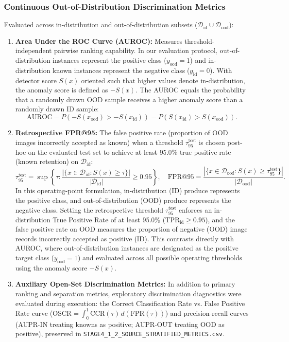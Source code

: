 \subsubsection{Continuous Out-of-Distribution Discrimination Metrics}
Evaluated across in-distribution and out-of-distribution subsets ($\mathcal{D}_{\text{id}} \cup \mathcal{D}_{\text{ood}}$):
\begin{enumerate}
\item \textbf{Area Under the ROC Curve (AUROC):} Measures threshold-independent pairwise ranking capability. In our evaluation protocol, out-of-distribution instances represent the positive class ($y_{\text{ood}} = 1$) and in-distribution known instances represent the negative class ($y_{\text{id}} = 0$). With detector score $S(x)$ oriented such that higher values denote in-distribution, the anomaly score is defined as $-S(x)$. The AUROC equals the probability that a randomly drawn OOD sample receives a higher anomaly score than a randomly drawn ID sample:
\begin{equation}
\text{AUROC} = P(-S(x_{\text{ood}}) > -S(x_{\text{id}})) = P(S(x_{\text{id}}) > S(x_{\text{ood}})).
\end{equation}
\item \textbf{Retrospective FPR@95:} The false positive rate (proportion of OOD images incorrectly accepted as known) when a threshold $\tau_{95}^{\text{test}}$ is chosen post-hoc on the evaluated test set to achieve at least 95.0\% true positive rate (known retention) on $\mathcal{D}_{\text{id}}$:
\begin{equation}
\tau_{95}^{\text{test}} = \sup \left\{ \tau : \frac{|\{x \in \mathcal{D}_{\text{id}} : S(x) \ge \tau\}|}{|\mathcal{D}_{\text{id}}|} \ge 0.95 \right\}, \quad \text{FPR@95} = \frac{|\{x \in \mathcal{D}_{\text{ood}} : S(x) \ge \tau_{95}^{\text{test}}\}|}{|\mathcal{D}_{\text{ood}}|}.
\end{equation}
In this operating-point formulation, in-distribution (ID) produce represents the positive class, and out-of-distribution (OOD) produce represents the negative class. Setting the retrospective threshold $\tau_{95}^{\text{test}}$ enforces an in-distribution True Positive Rate of at least 95.0\% ($\text{TPR}_{\text{id}} \ge 0.95$), and the false positive rate on OOD measures the proportion of negative (OOD) image records incorrectly accepted as positive (ID). This contrasts directly with AUROC, where out-of-distribution instances are designated as the positive target class ($y_{\text{ood}} = 1$) and evaluated across all possible operating thresholds using the anomaly score $-S(x)$.
\item \textbf{Auxiliary Open-Set Discrimination Metrics:} In addition to primary ranking and separation metrics, exploratory discrimination diagnostics were evaluated during execution: the Correct Classification Rate vs. False Positive Rate curve ($\text{OSCR} = \int_0^1 \text{CCR}(\tau) \, d(\text{FPR}(\tau))$) and precision-recall curves (AUPR-IN treating knowns as positive; AUPR-OUT treating OOD as positive), preserved in {\small\nolinkurl{STAGE4_1_2_SOURCE_STRATIFIED_METRICS.csv}}.
\end{enumerate}

